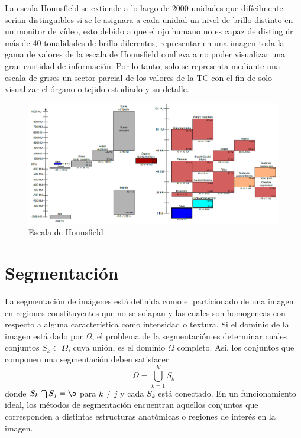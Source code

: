 \documentclass[12pt]{report}
\begin{document}
La escala Hounsfield se extiende a lo largo de 2000 unidades que difícilmente serían distinguibles si se le asignara a cada unidad un nivel de brillo distinto en un monitor de vídeo, esto debido a que el ojo humano no es capaz de distinguir más de 40 tonalidades de brillo diferentes, representar en una imagen toda la gama de valores de la escala de Hounsfield conlleva a no poder visualizar una gran cantidad de información. Por lo tanto, solo se representa mediante una escala de grises un sector parcial de los valores de la TC con el fin de solo visualizar el órgano o tejido estudiado y su detalle.\cite{hounsdos}\\
\begin{figure}[H]
\centering
\includegraphics[width = 13 cm, height = 10 cm]{escala}
\caption{Escala de Hounsfield}
\end{figure}



\section{Segmentación}
La segmentación de imágenes está definida como el particionado de una imagen en regiones constituyentes que no se solapan y las cuales son homogeneas con respecto a alguna característica como intensidad o textura. Si el dominio de la imagen está dado por $\Omega$, el problema de la segmentación es determinar cuales conjuntos $S_{k} \subset \Omega$, cuya unión, es el dominio $\Omega$ completo. Así, los conjuntos que componen una segmentación deben satisfacer \begin{equation} \Omega = \bigcup_{k = 1}^{K} S_{k} \end{equation}
donde $S_{k} \bigcap S_{j} = \o$ para $ k \neq j$ y cada $S_{k}$ está conectado. En un funcionamiento ideal, los métodos de segmentación encuentran aquellos conjuntos que corresponden a distintas estructuras anatómicas o regiones de interés en la imagen.\\
\end{document}
